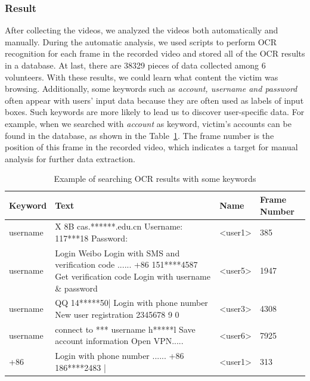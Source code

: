 \subsubsection{Result}

After collecting the videos, we analyzed the videos both automatically and manually. 
During the automatic analysis, we used scripts to perform OCR recognition for each frame in the recorded video and stored all of the OCR results in a database.
At last, there are 38329 pieces of data collected among 6 volunteers.
With these results, we could learn what content the victim was browsing.
Additionally, some keywords such as \textit{account, username and password} often appear with users' input data because they are often used as labels of input boxes.
Such keywords are more likely to lead us to discover user-specific data.
For example, when we searched with \textit{account} as keyword, victim's accounts can be found in the database, as shown in the Table~\ref{tab:ocr_keyword_example}.
The frame number is the position of this frame in the recorded video, which indicates a target for manual analysis for further data extraction.

\begin{table}[t]
	\centering
	\begin{tabular}{|l|l|l|l|}
		\hline
		Keyword  & Text                                                                                                                          & Name                           & Frame Number \\ \hline
		username & X 8B cas.******.edu.cn Username: 117***18 Password:                                                                           & \textless{}user1\textgreater{} & 385          \\ \hline
		username & Login Weibo Login with SMS and verification code ...... +86 151****4587 Get verification code Login with username \& password & \textless{}user5\textgreater{} & 1947         \\ \hline
		username & QQ 14*****50| Login with phone number New user registration 2345678 9 0                                                       & \textless{}user3\textgreater{} & 4308         \\ \hline
		username & connect to *** username h*****l Save account information Open VPN.....                                                        & \textless{}user6\textgreater{} & 7925         \\ \hline
		+86      & Login with phone number ...... +86 186****2483 |                                                                              & \textless{}user1\textgreater{} & 313          \\ \hline
	\end{tabular}
	\caption{Example of searching OCR results with some keywords}
	\label{tab:ocr_keyword_example}
\end{table}


